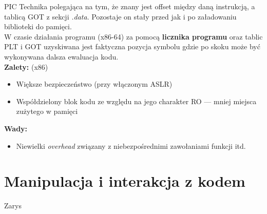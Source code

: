 \begin{frame}{PIC}
  Technika polegająca na tym, że znany jest offset między daną instrukcją, a
  tablicą GOT z sekcji \textit{.data}. Pozostaje on stały przed jak i po
  załadowaniu biblioteki do pamięci.\\
  W czasie działania programu (x86-64) za pomocą \textbf{licznika programu} oraz
  tablic PLT i GOT uzyskiwana jest faktyczna pozycja symbolu gdzie po skoku może
  być wykonywana dalsza ewaluacja kodu.
  \vspace{\baselineskip}\\
  \textbf{Zalety:} (x86)
  \begin{itemize}
  \item Większe bezpieczeństwo (przy włączonym ASLR)
  \item Współdzielony blok kodu ze względu na jego charakter RO --- 
		mniej miejsca zużytego w pamięci
  \end{itemize}
  \textbf{Wady:}
  \begin{itemize}
  \item Niewielki \textit{overhead} związany z niebezpośrednimi zawołaniami
    funkcji itd.
  \end{itemize}
\end{frame}
\part{Manipulacja i interakcja z kodem}
\begin{frame}{Zarys}
  \tableofcontents
\end{frame}
